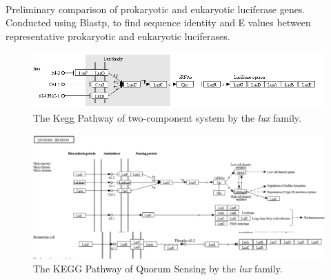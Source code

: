 \documentclass[fleqn,12pt]{wlscirep}
\begin{document}
\begin{table}[!ht]
\caption{Comparison of Eukaryote and Prokaryote Luciferases}
\\
\begin{flushleft}Preliminary comparison of prokaryotic and eukaryotic luciferase genes. Conducted using Blastp, to find sequence identity and E values between representative prokaryotic and eukaryotic luciferases.\end{flushleft}
\label{table2}
\end{table}

\begin{figure}[ht]
\includegraphics[width=\textwidth]{pathway-1.png}
\caption{The Kegg Pathway of two-component system by the \textit{lux} family.\cite{11}}
\centering
\label{fig5}
\end{figure}

\begin{figure}[ht]
\includegraphics[width=\textwidth]{pathway-2.png}
\caption{The KEGG Pathway of Quorum Sensing by the \textit{lux} family.\cite{11}}
\centering
\label{fig6}
\end{figure}
\end{document}
